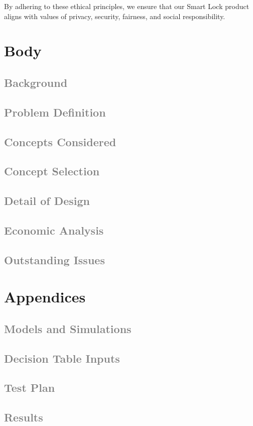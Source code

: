 \documentclass[a4paper,12pt]{report}
\begin{document}
By adhering to these ethical principles, we ensure that our Smart Lock product aligns with values of privacy, security, fairness, and social responsibility.


\tableofcontents

\newpage

\section{Body}
\subsection{\textcolor{gray}{Background}}
\subsection{\textcolor{gray}{Problem Definition}}
\subsection{\textcolor{gray}{Concepts Considered}}
\subsection{\textcolor{gray}{Concept Selection}}
\subsection{\textcolor{gray}{Detail of Design}}
\subsection{\textcolor{gray}{Economic Analysis}}
\subsection{\textcolor{gray}{Outstanding Issues}}
\section{Appendices}
\subsection{\textcolor{gray}{Models and Simulations}}
\subsection{\textcolor{gray}{Decision Table Inputs}}
\subsection{\textcolor{gray}{Test Plan}}
\subsection{\textcolor{gray}{Results}}
\end{document}
